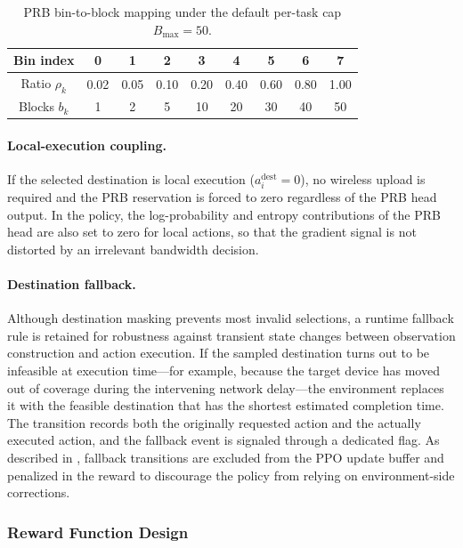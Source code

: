 \begin{table}[htbp]
    \centering
    \small
    \begin{tabular}{ccccccccc}
        \hline
        \textbf{Bin index} & 0 & 1 & 2 & 3 & 4 & 5 & 6 & 7 \\
        \hline
        Ratio \(\rho_k\) & 0.02 & 0.05 & 0.10 & 0.20 & 0.40 & 0.60 & 0.80 & 1.00 \\
        Blocks \(b_k\) & 1 & 2 & 5 & 10 & 20 & 30 & 40 & 50 \\
        \hline
    \end{tabular}
    \caption{PRB bin-to-block mapping under the default per-task cap \(B_{\max}=50\).}
    \label{tab:prb-bin-mapping}
\end{table}

\paragraph{Local-execution coupling.}
If the selected destination is local execution (\(a_i^{\mathrm{dest}} = 0\)), no wireless upload is required and the PRB reservation is forced to zero regardless of the PRB head output. In the policy, the log-probability and entropy contributions of the PRB head are also set to zero for local actions, so that the gradient signal is not distorted by an irrelevant bandwidth decision.

\paragraph{Destination fallback.}
Although destination masking prevents most invalid selections, a runtime fallback rule is retained for robustness against transient state changes between observation construction and action execution. If the sampled destination turns out to be infeasible at execution time---for example, because the target device has moved out of coverage during the intervening network delay---the environment replaces it with the feasible destination that has the shortest estimated completion time. The transition records both the originally requested action and the actually executed action, and the fallback event is signaled through a dedicated flag. As described in , fallback transitions are excluded from the PPO update buffer and penalized in the reward to discourage the policy from relying on environment-side corrections.

\subsubsection{Reward Function Design}
\label{subsec:reward-function}

